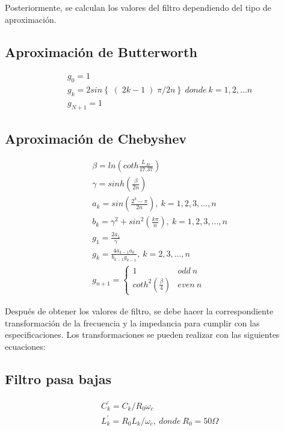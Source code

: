 Posteriormente, se calculan los valores del filtro dependiendo del tipo de aproximación.


\subsection*{Aproximación de Butterworth}
\begin{subequations}
    \begin{align}
        & g_{0} = 1 \\
        & g_{k} = 2 sin\left\{ \right( 2k - 1 \left) \pi / 2n \right\}~donde~k=1,2,...n \\
        & g_{N + 1} = 1
    \end{align}
\end{subequations}


\subsection*{Aproximación de Chebyshev}
\begin{subequations}
    \begin{align}
        & \beta = ln \left( coth \frac{L_{Ar}}{17.37} \right) \\
        & \gamma = sinh \left( \frac{\beta}{2n} \right) \\
        & a_{k} = sin\left( \frac{2^{k} - \pi}{2n} \right),~k=1,2,3,...,n \\
        & b_{k} = \gamma^{2} + sin^{2}\left( \frac{k \pi}{n} \right),~k=1,2,3,...,n \\
        & g_{1} = \frac{2 a_{1}}{\gamma} \\
        & g_{k} = \frac{4 a_{k - 1} a_{k}}{b_{k - 1} g_{k - 1}},~k=2,3,...,n \\
        & g_{n+1} =
        \begin{cases}
            1 & odd~n \\
            coth^2(\frac{\beta}{4}) & even~n
        \end{cases}
    \end{align}
\end{subequations}

Después de obtener los valores de filtro, se debe hacer la correspondiente transformación de la frecuencia y la impedancia para cumplir con las especificaciones. Los transformaciones se pueden realizar con las siguientes ecuaciones:

\subsection*{Filtro pasa bajas}
\begin{subequations}
    \begin{align}
        & C_{k}^{'} = C_{k} / R_{0} \omega_{c} \\
        & L_{k}^{'} = R_{0} L_{k} / \omega_{c},~donde~R_{0} = 50 \Omega
    \end{align}
\end{subequations}


